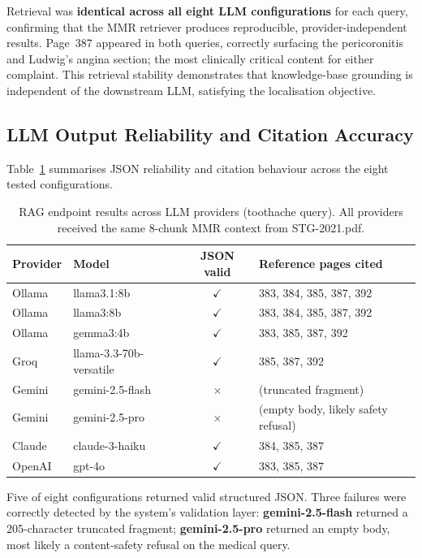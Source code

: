 \documentclass[12pt,a4paper]{report}
\begin{document}
Retrieval was \textbf{identical across all eight LLM configurations} for each
query, confirming that the MMR retriever produces reproducible, provider-independent
results. Page~387 appeared in both queries, correctly surfacing the pericoronitis
and Ludwig's angina section; the most clinically critical content for either
complaint. This retrieval stability demonstrates that knowledge-base grounding
is independent of the downstream LLM, satisfying the localisation objective.

\subsection{LLM Output Reliability and Citation Accuracy}

Table~\ref{tab:rag_reliability} summarises JSON reliability and citation
behaviour across the eight tested configurations.

\begin{table}[H]
\centering
\caption{RAG endpoint results across LLM providers (toothache query).
All providers received the same 8-chunk MMR context from STG-2021.pdf.}
\label{tab:rag_reliability}
\small
\renewcommand{\arraystretch}{1.2}
\begin{tabularx}{\textwidth}{@{}l l c X@{}}
\toprule
\textbf{Provider} & \textbf{Model} & \textbf{JSON valid} & \textbf{Reference pages cited} \\
\midrule
Ollama  & llama3.1:8b             & $\checkmark$ & 383, 384, 385, 387, 392 \\
Ollama  & llama3:8b               & $\checkmark$ & 383, 384, 385, 387, 392 \\
Ollama  & gemma3:4b               & $\checkmark$ &  383, 385, 387, 392 \\
Groq    & llama-3.3-70b-versatile & $\checkmark$ & 385, 387, 392 \\
Gemini  & gemini-2.5-flash        & $\times$ & (truncated fragment) \\
Gemini  & gemini-2.5-pro          & $\times$ & (empty body, likely safety refusal) \\
Claude  & claude-3-haiku          & $\checkmark$ & 384, 385, 387 \\
OpenAI  & gpt-4o                  & $\checkmark$ & 383, 385, 387 \\
\bottomrule
\end{tabularx}
\end{table}

Five of eight configurations returned valid structured JSON. Three failures
were correctly detected by the system's validation layer:
\textbf{gemini-2.5-flash} returned a 205-character truncated fragment;
\textbf{gemini-2.5-pro} returned an empty body, most likely a content-safety
refusal on the medical query.
\end{document}
